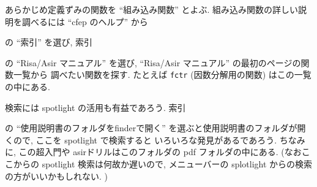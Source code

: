 \documentclass{jbook}
\begin{document}
あらかじめ定義ずみの関数を ``組み込み関数'' とよぶ.
  
組み込み関数の詳しい説明を調べるには
``cfep のヘルプ'' から
\begin{center}
\end{center}
の ``索引'' を選び, 索引
\begin{center}
\end{center}
の ``Risa/Asir マニュアル'' を選び,
``Risa/Asir マニュアル'' の最初のページの関数一覧から
調べたい関数を探す.
たとえば {\tt fctr} (因数分解用の関数) はこの一覧の中にある.
\begin{center}
\end{center}


検索には spotlight の活用も有益であろう. 索引
\begin{center}
\end{center}
の ``使用説明書のフォルダをfinderで開く''
を選ぶと使用説明書のフォルダが開くので, ここを spotlight で検索すると
いろいろな発見があるであろう.
ちなみに, この超入門や asirドリルはこのフォルダの pdf フォルダの中にある.
(なおここからの spotlight 検索は何故か遅いので, メニューバーの 
 splotlight からの検索の方がいいかもしれない.
)
\end{document}
